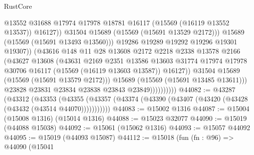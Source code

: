 \begin{lexlean}{RustCore}
\begin{coremodule}
                                      @13552
                                      @31688
                                      @17974
                                      @17978
                                      @18781
                                      @16117
                                      (@15569 (@16119 @13552 @13537))
                                      @16127))
                                  @31504
                                  @15689
                                  (@15569 (@15691 @13529 @2172)))
                                @15689
                                (@15569 (@15691 @13493 @13560)))
                              @19286
                              @19289
                              @19292
                              @19296
                              @19301
                              @19307))
                          (@43616
                            @148
                            @11
                            @28
                            @13608
                            @2172
                            @2218
                            @2338
                            @13578
                            @2166
                            (@43627
                              @13608
                              (@43631
                                @2169
                                @2351
                                @13586
                                @13603
                                @31774
                                @17974
                                @17978
                                @30706
                                @16117
                                (@15569 (@16119 @13603 @13587))
                                @16127))
                            @31504
                            @15689
                            (@15569 (@15691 @13579 @2172)))
                          @15689
                          (@15569 (@15691 @13485 @13611)))
                        @23828
                        @23831
                        @23834
                        @23838
                        @23843
                        @23849))))))))))
@44082 := @43287
    (@43312
      (@43353
        (@43355 (@43357 (@43374 (@43390 (@43407 (@43420 (@43428 (@43432 (@43514 @44070)))))))))))
@44083 := @15002 @1316
@44087 := @15004 (@15008 @1316) (@15014 @1316)
@44088 := @15023 @32077
@44090 := @15019 (@44088 @15038)
@44092 := @15061 (@15062 @1316)
@44093 := @15057 @44092
@44095 := @15019 (@44093 @15087)
@44112 := @15018
    (fun (fn : @96) =>
    @44090
      (@15041

\end{coremodule}
\end{lexlean}
